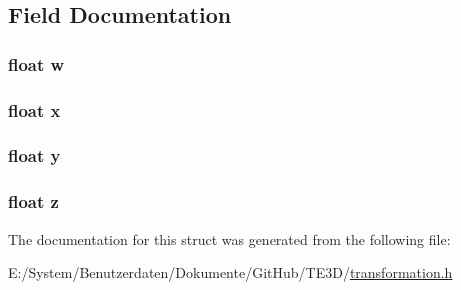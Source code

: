 \subsection{Field Documentation}
\hypertarget{struct_t_e3_d___vector4f_a56eca241e2896b9f57a79589e76fd24b}{
\subsubsection[{w}]{\setlength{\rightskip}{0pt plus 5cm}float w}}\label{struct_t_e3_d___vector4f_a56eca241e2896b9f57a79589e76fd24b}
\hypertarget{struct_t_e3_d___vector4f_ad0da36b2558901e21e7a30f6c227a45e}{
\subsubsection[{x}]{\setlength{\rightskip}{0pt plus 5cm}float x}}\label{struct_t_e3_d___vector4f_ad0da36b2558901e21e7a30f6c227a45e}
\hypertarget{struct_t_e3_d___vector4f_aa4f0d3eebc3c443f9be81bf48561a217}{
\subsubsection[{y}]{\setlength{\rightskip}{0pt plus 5cm}float y}}\label{struct_t_e3_d___vector4f_aa4f0d3eebc3c443f9be81bf48561a217}
\hypertarget{struct_t_e3_d___vector4f_af73583b1e980b0aa03f9884812e9fd4d}{
\subsubsection[{z}]{\setlength{\rightskip}{0pt plus 5cm}float z}}\label{struct_t_e3_d___vector4f_af73583b1e980b0aa03f9884812e9fd4d}


The documentation for this struct was generated from the following file\-:\begin{DoxyCompactItemize}
\item 
E\-:/\-System/\-Benutzerdaten/\-Dokumente/\-Git\-Hub/\-T\-E3\-D/\hyperlink{transformation_8h}{transformation.\-h}\end{DoxyCompactItemize}
